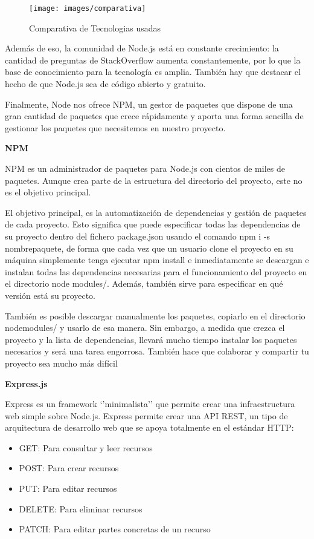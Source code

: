 \begin{figure}[!th]
\begin{center}
\texttt{[image: images/comparativa]}
\caption{Comparativa de Tecnologias usadas}
\label{fig:Comparativa de Tecnologias usadas}
\end{center}
\end{figure}

Además de eso, la comunidad de Node.js está en constante crecimiento: la cantidad de preguntas de StackOverflow aumenta constantemente, por lo que la base de conocimiento para la tecnología es amplia. También hay que destacar el hecho de que Node.js sea de código abierto y gratuito. 

Finalmente, Node nos ofrece NPM, un gestor de paquetes que dispone de una gran cantidad de paquetes que crece rápidamente y aporta una forma sencilla de gestionar los paquetes que necesitemos en nuestro proyecto.

{\bf NPM}

NPM es un administrador de paquetes para Node.js con cientos de miles de paquetes. Aunque crea parte de la estructura del directorio del proyecto, este no es el objetivo principal.

El objetivo principal, es la automatización de dependencias y gestión de paquetes de cada proyecto. Esto significa que puede especificar todas las dependencias de su proyecto dentro del fichero package.json usando el comando npm i -s nombrepaquete, de forma que cada vez que un usuario clone el proyecto en su máquina simplemente tenga ejecutar npm install e inmediatamente se descargan e instalan todas las dependencias necesarias para el funcionamiento del proyecto en el directorio node modules/. Además, también sirve para especificar en qué versión está su proyecto.

También es posible descargar manualmente los paquetes, copiarlo en el directorio nodemodules/ y usarlo de esa manera. Sin embargo, a medida que crezca el proyecto y la lista de dependencias, llevará mucho tiempo instalar los paquetes necesarios y será una tarea engorrosa. También hace que colaborar y compartir tu proyecto sea mucho más difícil

{\bf Express.js}

Express es un framework ‘’minimalista’’ que permite crear una infraestructura web simple sobre Node.js. Express permite crear una API REST, un tipo de arquitectura de desarrollo web que se apoya totalmente en el estándar HTTP:

\begin{itemize}
  \item GET: Para consultar y leer recursos
  \item POST: Para crear recursos
  \item PUT: Para editar recursos
  \item DELETE: Para eliminar recursos
  \item PATCH: Para editar partes concretas de un recurso
\end{itemize}

